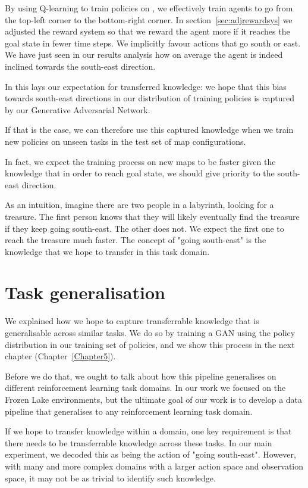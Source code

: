 By using Q-learning to train policies on , we effectively train agents to go from the top-left corner to the bottom-right corner.
In section~\ref{sec:adjrewardsys} we adjusted the reward system so that we reward the agent more if it reaches the goal state in fewer time steps. We implicitly favour actions that go south or east. We have just seen in our results analysis how on average the agent is indeed inclined towards the south-east direction.

In this lays our expectation for transferred knowledge: we hope that this bias towards south-east directions in our distribution of training policies is captured by our Generative Adversarial Network.

If that is the case, we can therefore use this captured knowledge when we train new policies on unseen tasks in the test set of map configurations.

In fact, we expect the training process on new maps to be faster given the knowledge that in order to reach goal state, we should give priority to the south-east direction.

As an intuition, imagine there are two people in a labyrinth, looking for a treasure. The first person knows that they will likely eventually find the treasure if they keep going south-east. The other does not. We expect the first one to reach the treasure much faster. The concept of "going south-east" is the knowledge that we hope to transfer in this task domain.

\section{Task generalisation}
\label{sec:taskgeneralisation}
We explained how we hope to capture transferrable knowledge that is generalisable across similar tasks. We do so by training a GAN using the policy distribution in our training set of policies, and we show this process in the next chapter (Chapter~\ref{Chapter5}).

Before we do that, we ought to talk about how this pipeline generalises on different reinforcement learning task domains. In our work we focused on the Frozen Lake environments, but the ultimate goal of our work is to develop a data pipeline that generalises to any reinforcement learning task domain.

If we hope to transfer knowledge within a domain, one key requirement is that there needs to be transferrable knowledge across these tasks. In our main experiment, we decoded this as being the action of "going south-east". However, with many and more complex domains with a larger action space and observation space, it may not be as trivial to identify such knowledge.

